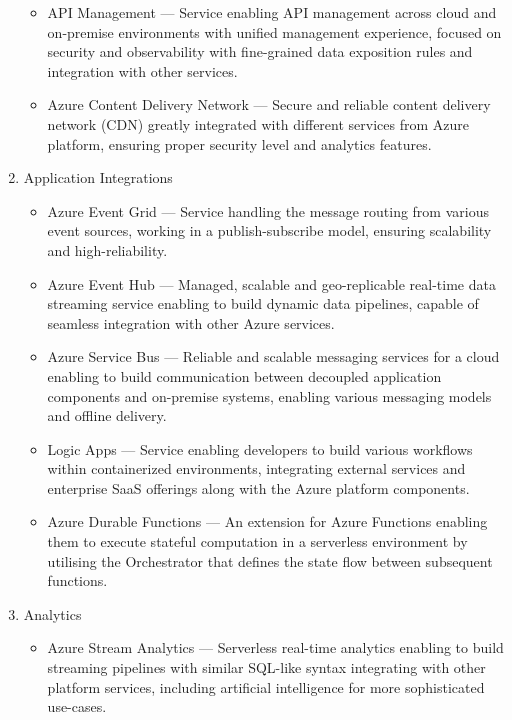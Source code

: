 \begin{enumerate}
   \begin{itemize}
       \item API Management --- Service enabling API management across cloud and on-premise environments with unified management experience, focused on security and observability with fine-grained data exposition rules and integration with other services.
       \item Azure Content Delivery Network --- Secure and reliable content delivery network (CDN) greatly integrated with different services from Azure platform, ensuring proper security level and analytics features.
   \end{itemize}
   \item Application Integrations
   \begin{itemize}
       \item Azure Event Grid --- Service handling the message routing from various event sources, working in a publish-subscribe model, ensuring scalability and high-reliability.
       \item Azure Event Hub --- Managed, scalable and geo-replicable real-time data streaming service enabling to build dynamic data pipelines, capable of seamless integration with other Azure services.
       \item Azure Service Bus --- Reliable and scalable messaging services for a cloud enabling to build communication between decoupled application components and on-premise systems, enabling various messaging models and offline delivery.
       \item Logic Apps --- Service enabling developers to build various workflows within containerized environments, integrating external services and enterprise SaaS offerings along with the Azure platform components.
       \item Azure Durable Functions --- An extension for Azure Functions enabling them to execute stateful computation in a serverless environment by utilising the Orchestrator that defines the state flow between subsequent functions.
   \end{itemize}
   \item Analytics
   \begin{itemize}
       \item Azure Stream Analytics --- Serverless real-time analytics enabling to build streaming pipelines with similar SQL-like syntax integrating with other platform services, including artificial intelligence for more sophisticated use-cases.
   \end{itemize}

\end{enumerate}
